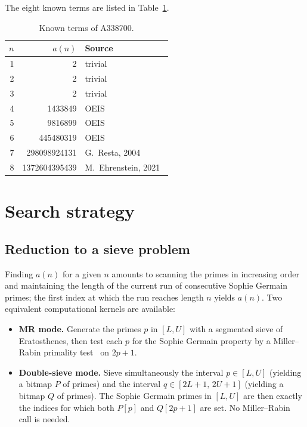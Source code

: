 \documentclass[11pt,a4paper]{article}
\theoremstyle{definition}
\begin{document}
The eight known terms are listed in Table~\ref{tab:known}.

\begin{table}[ht]
\centering
\caption{Known terms of A338700.}
\label{tab:known}
\begin{tabular}{rrl}
\toprule
$n$ & $a(n)$ & Source \\
\midrule
1 & 2 & trivial \\
2 & 2 & trivial \\
3 & 2 & trivial \\
4 & \num{1433849} & OEIS \\
5 & \num{9816899} & OEIS \\
6 & \num{445480319} & OEIS \\
7 & \num{298098924131} & G.\ Resta, 2004~\cite{rivera-puzzle71} \\
8 & \num{1372604395439} & M.\ Ehrenstein, 2021~\cite{oeis-a338700} \\
\bottomrule
\end{tabular}
\end{table}

\section{Search strategy}

\subsection{Reduction to a sieve problem}

Finding $a(n)$ for a given $n$ amounts to scanning the primes in
increasing order and maintaining the length of the current run of
consecutive Sophie Germain primes; the first index at which the run
reaches length $n$ yields $a(n)$. Two equivalent computational kernels
are available:

\begin{itemize}
\item \textbf{MR mode.} Generate the primes $p$ in $[L,U]$ with a
segmented sieve of Eratosthenes, then test each $p$ for the Sophie
Germain property by a Miller--Rabin primality test~\cite{miller,miller-rabin} on $2p+1$.

\item \textbf{Double-sieve mode.} Sieve simultaneously the interval
$p \in [L,U]$ (yielding a bitmap $P$ of primes) and the interval
$q \in [2L+1,\,2U+1]$ (yielding a bitmap $Q$ of primes). The Sophie
Germain primes in $[L,U]$ are then exactly the indices for which both
$P[p]$ and $Q[2p+1]$ are set. No Miller--Rabin call is needed.
\end{itemize}
\end{document}
